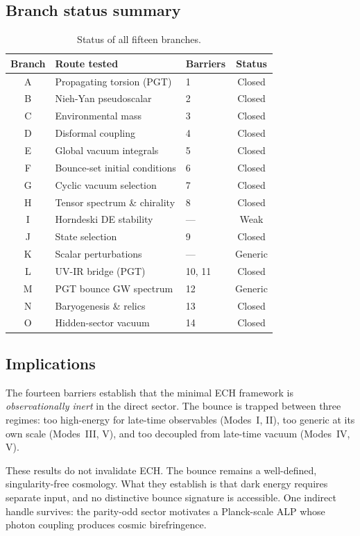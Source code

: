 \documentclass[aps,prd,twocolumn,superscriptaddress,showpacs,preprintnumbers,nofootinbib,longbibliography,floatfix]{revtex4-2}
\begin{document}
\subsection{Branch status summary}

\begin{table}[h]
\centering
\caption{Status of all fifteen branches.}
\label{tab:branches}
\begin{tabular}{cllc}
\hline\hline
Branch & Route tested & Barriers & Status \\
\hline
A & Propagating torsion (PGT) & 1 & Closed \\
B & Nieh-Yan pseudoscalar & 2 & Closed \\
C & Environmental mass & 3 & Closed \\
D & Disformal coupling & 4 & Closed \\
E & Global vacuum integrals & 5 & Closed \\
F & Bounce-set initial conditions & 6 & Closed \\
G & Cyclic vacuum selection & 7 & Closed \\
H & Tensor spectrum \& chirality & 8 & Closed \\
I & Horndeski DE stability & --- & Weak \\
J & State selection & 9 & Closed \\
K & Scalar perturbations & --- & Generic \\
L & UV-IR bridge (PGT) & 10, 11 & Closed \\
M & PGT bounce GW spectrum & 12 & Generic \\
N & Baryogenesis \& relics & 13 & Closed \\
O & Hidden-sector vacuum & 14 & Closed \\
\hline\hline
\end{tabular}
\end{table}

\subsection{Implications}

The fourteen barriers establish that the minimal ECH framework is
\emph{observationally inert} in the direct sector.  The bounce is trapped
between three regimes: too high-energy for late-time observables (Modes~I,
II), too generic at its own scale (Modes~III, V), and too decoupled from
late-time vacuum (Modes~IV, V).

These results do not invalidate ECH.  The bounce remains a well-defined,
singularity-free cosmology.  What they establish is that dark energy requires
separate input, and no distinctive bounce signature is accessible.  One
indirect handle survives: the parity-odd sector motivates a Planck-scale ALP
whose photon coupling produces cosmic birefringence.
\end{document}
